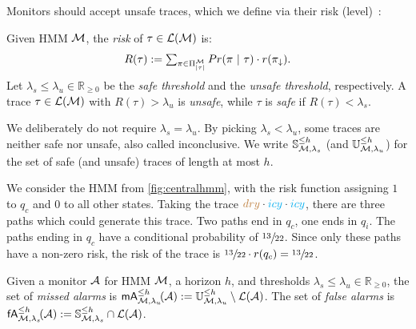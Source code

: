 \documentclass[runningheads]{llncs}
\newcommand{\Obs}{Z}
\newcommand{\icy}{{\color{cyan} icy}\xspace}
\newcommand{\dry}{{\color{brown} dry}\xspace}
\newcommand{\safetraces}[2]{\mathbb{S}_{#1}^{#2}}
\newcommand{\unsafetraces}[2]{\mathbb{U}_{#1}^{#2}}
\newcommand{\missedalarms}[2]{\mathsf{mA}_{#1}^{#2}}
\newcommand{\falsealarms}[2]{\mathsf{fA}_{#1}^{#2}}
\newcommand{\defeq}{:=}
\begin{document}
\noindent Monitors should accept unsafe traces, which we define via their risk (level)~\cite{jungesRuntimeMonitorsMarkov2021}:
\begin{definition}\label{def:safeunsafe}
    Given HMM $\mathcal{M}$, the \emph{risk} of $\tau \in \mathcal{L}(\mathcal{M})$ is: \[\textstyle R(\tau) \defeq \sum\nolimits_{\pi\in\Pi_{|\tau|}^\mc}\Prob(\pi \ |\ \tau) \cdot r(\pi_{\downarrow}).\]
    Let $\lambda_s \leq \lambda_u \in \mathbb{R}_{\geq 0}$ be the \emph{safe threshold}  and the \emph{unsafe threshold}, respectively.
    A trace $\tau \in \mathcal{L}(\mathcal{M})$ with $R(\tau) > \lambda_u$ is \emph{unsafe}, while $\tau$ is \emph{safe} if $R(\tau) < \lambda_s$.
\end{definition}
We deliberately do not require $\lambda_s = \lambda_u$.
By picking $\lambda_s < \lambda_u$, some traces are neither safe nor unsafe, also called inconclusive.
We write $\safetraces{\mc,\lambda_s}{\leq h}$ (and $\unsafetraces{\mc,\lambda_u}{\leq h}$) for the set of safe (and unsafe) traces of length at most $h$.
\begin{example}\label{ex:riskoftrace}
    We consider the HMM from \cref{fig:centralhmm}, with the risk function assigning $1$ to $q_c$ and $0$ to all other states. Taking the trace $\dry \cdot \icy \cdot \icy$, there are three paths which could generate this trace. Two paths end in $q_c$, one ends in $q_i$. The paths ending in $q_c$ have a conditional probability of $\sfrac{13}{22}$. Since only these paths have a non-zero risk, the risk of the trace is $\sfrac{13}{22} \cdot r(q_c) = \sfrac{13}{22}$.
\end{example}
\begin{definition}
    Given a monitor $\mathcal{A}$ for HMM $\mathcal{M}$, a horizon $h$, and thresholds $\lambda_s \leq \lambda_u \in \mathbb{R}_{\geq 0}$, the set of \emph{missed alarms} is $\missedalarms{\mc,\lambda_u}{\leq h}\!(\dfa) \defeq \unsafetraces{\mc,\lambda_u}{\leq h} \setminus \lang{\dfa}$. The set of \emph{false alarms} is $\falsealarms{\mc,\lambda_s}{\leq h}\!(\dfa) \defeq \safetraces{\mc,\lambda_s}{\leq h} \cap \lang{\dfa}$.
\end{definition}
\end{document}

